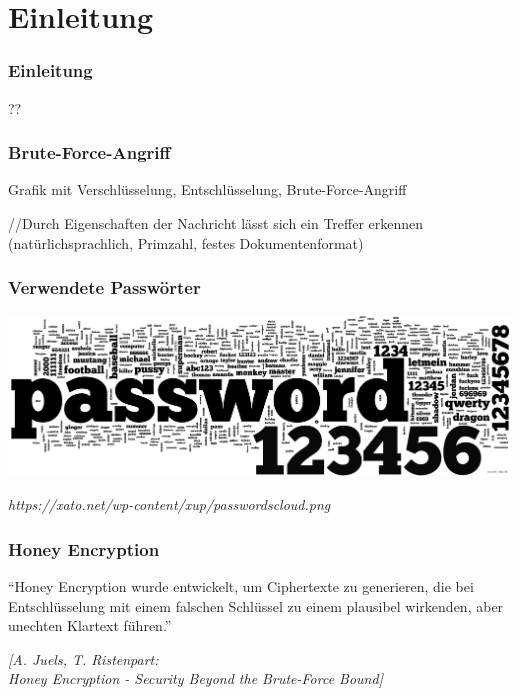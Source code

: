 \section{Einleitung}

\begin{frame}[c]
	\frametitle{Einleitung}

??

\end{frame}

\begin{frame}[c]
	\frametitle{Brute-Force-Angriff}

	Grafik mit Verschlüsselung, Entschlüsselung, Brute-Force-Angriff 

	//Durch Eigenschaften der Nachricht lässt sich ein Treffer erkennen (natürlichsprachlich, Primzahl, festes Dokumentenformat)

\end{frame}

\begin{frame}[c]
	\frametitle{Verwendete Passwörter}

	\begin{center}
		\includegraphics[width=\textwidth]{pic/passwordscloud.png}

		\emph{https://xato.net/wp-content/xup/passwordscloud.png}
	\end{center}
\end{frame}

\begin{frame}[c]
	\frametitle{Honey Encryption}

	\begin{center}
		"`Honey Encryption wurde entwickelt, um Ciphertexte zu generieren, die bei Entschlüsselung mit einem falschen Schlüssel zu einem plausibel wirkenden, aber unechten Klartext führen."'

		\vspace*{1cm}

		\textit{ [A. Juels, T. Ristenpart:\\ Honey Encryption - Security Beyond the Brute-Force Bound]}
	\end{center}
\end{frame}